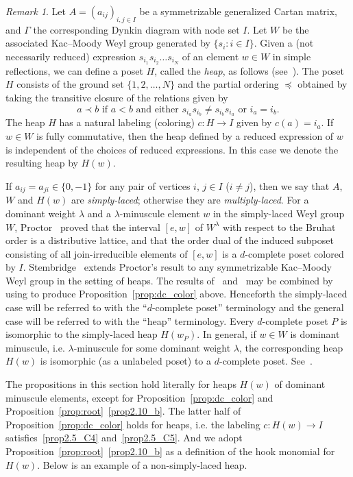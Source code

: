 \documentclass[10pt]{amsart}
\theoremstyle{definition}
\theoremstyle{remark}
\newtheorem{rema}[theo]{Remark}
\begin{document}
\begin{rema}
\label{rem:heap1}
Let $A = (a_{ij})_{i,j \in I}$ be a symmetrizable generalized Cartan matrix, 
and $\Gamma$ the corresponding Dynkin diagram with node set $I$.
Let $W$ be the associated Kac--Moody Weyl group generated by $\{ s_i : i \in I \}$.
Given a (not necessarily reduced) expression $s_{i_1} s_{i_2} \dots s_{i_N}$ of an element $w \in W$ 
in simple reflections, we can define a poset $H$, called the \emph{heap}, as follows 
(see~\cite{Stem1}).
The poset $H$ consists of the ground set $\{ 1, 2, \dots, N \}$ and the partial ordering 
$\preceq$ obtained by taking the transitive closure of the relations given by
$$
\text{$a \prec b$ if $a < b$ and either $s_{i_a} s_{i_b} \neq s_{i_b} s_{i_a}$ or $i_a = i_b$.}
$$
The heap $H$ has a natural labeling (coloring) $c: H \to I$ given by $c(a) = i_a$.
If $w \in W$ is fully commutative, then the heap defined by a reduced expression of $w$ 
is independent of the choices of reduced expressions.
In this case we denote the resulting heap by $H(w)$.

If $a_{ij} = a_{ji} \in \{ 0, -1 \}$ for any pair of vertices $i$, $j \in I$ ($i \neq j$), 
then we say that $A$, $W$ and $H(w)$ are \emph{simply-laced}; 
otherwise they are \emph{multiply-laced}.
For a dominant weight $\lambda$ and a $\lambda$-minuscule element $w$ in the simply-laced Weyl group $W$,
Proctor~\cite{Proc2} proved that the interval $[e,w]$ of $W^\lambda$ with respect to 
the Bruhat order is a distributive lattice, 
and that the order dual of the induced subposet consisting of all join-irreducible elements of $[e,w]$ 
is a $d$-complete poset colored by $I$.
Stembridge~\cite{Stem2} extends Proctor's result to any symmetrizable Kac--Moody Weyl group 
in the setting of heaps.
The results of~\cite{Proc2} and~\cite{Stem2} may be combined by using 
\cite[Theorem~3.2~(c)]{Stem1} to produce Proposition~\ref{prop:dc_color} above.
Henceforth the simply-laced case will be referred to with the ``$d$-complete poset'' terminology 
and the general case will be referred to with the ``heap'' terminology.
Every $d$-complete poset $P$ is isomorphic to the simply-laced heap $H(w_P)$. 
In general, if $w \in W$ is dominant minuscule, i.e. $\lambda$-minuscule for some dominant weight $\lambda$, 
the corresponding heap $H(w)$ is isomorphic (as a unlabeled poset) to a $d$-complete poset.
See~\cite[Sections~3 and~4]{Stem2}.

The propositions in this section hold literally for heaps $H(w)$ of dominant minuscule elements, 
except for Proposition~\ref{prop:dc_color} and Proposition~\ref{prop:root}~\ref{prop2.10_b}.
The latter half of Proposition~\ref{prop:dc_color} holds for heaps, 
i.e. the labeling $c : H(w) \to I$ satisfies~\ref{prop2.5_C4} and~\ref{prop2.5_C5}.
And we adopt Proposition~\ref{prop:root}~\ref{prop2.10_b} as a definition of the hook monomial for $H(w)$.
Below is an example of a non-simply-laced heap.
\end{rema}
\end{document}
